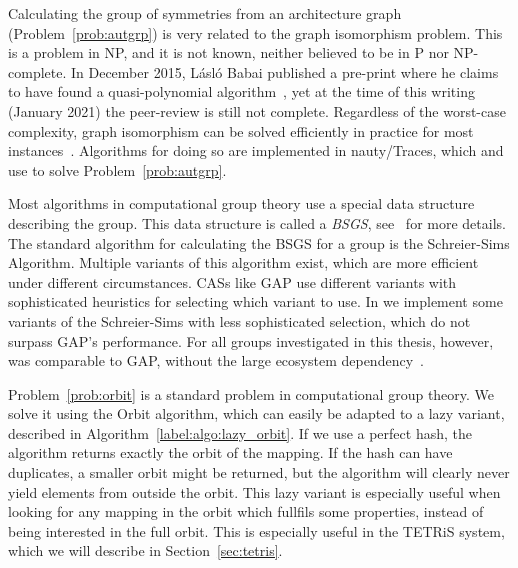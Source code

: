 Calculating the group of symmetries from an architecture graph (Problem~\ref{prob:autgrp}) is very related to the graph isomorphism problem. 
This is a problem in NP, and it is not known, neither believed to be in P nor NP-complete. 
In December 2015, L\'{a}sl\'{o} Babai published a pre-print where he claims to have found a quasi-polynomial algorithm~\cite{babai_graph_isomoprhism}, 
yet at the time of this writing (January 2021) the peer-review is still not complete.
Regardless of the worst-case complexity, graph isomorphism can be solved efficiently in practice for most instances~\cite{McKay201493}.
Algorithms for doing so are implemented in nauty/Traces, which \mocasin and \mpsym use to solve Problem~\ref{prob:autgrp}.

Most algorithms in computational group theory use a special data structure describing the group.
This data structure is called a \emph{\ac{BSGS}}, see~\cite{holt,seress2003permutation} for more details.
The standard algorithm for calculating the \ac{BSGS} for a group is the Schreier-Sims Algorithm.
Multiple variants of this algorithm exist, which are more efficient under different circumstances.
\acp{CAS} like \ac{GAP} use different variants with sophisticated heuristics for selecting which variant to use.
In \mpsym we implement some variants of the Schreier-Sims with less sophisticated selection, which do not surpass \ac{GAP}'s performance.
For all groups investigated in this thesis, however, \mpsym was comparable to \ac{GAP}, without the large ecosystem dependency~\cite{nicolai_studienarbeit,goens_tcad21}.

Problem~\ref{prob:orbit} is a standard problem in computational group theory.
We solve it using the Orbit algorithm, which can easily be adapted to a lazy variant, described in Algorithm~\ref{label:algo:lazy_orbit}.
If we use a perfect hash, the algorithm returns exactly the orbit of the mapping.
If the hash can have duplicates, a smaller orbit might be returned, but the algorithm will clearly never yield elements from outside the orbit.
This lazy variant is especially useful when looking for any mapping in the orbit which fullfils some properties, instead of being interested in the full orbit.
This is especially useful in the \acs*{TETRiS} system, which we will describe in Section~\ref{sec:tetris}.

